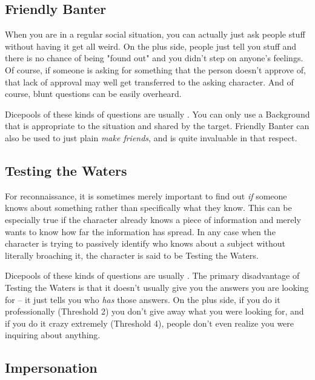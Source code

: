 \subsection{Friendly Banter}

When you are in a regular social situation, you can actually just ask people stuff without having it get all weird. On the plus side, people just tell you stuff and there is no chance of being "found out" and you didn't step on anyone's feelings. Of course, if someone is asking for something that the person doesn't approve of, that lack of approval may well get transferred to the asking character. And of course, blunt questions can be easily overheard.

Dicepools of these kinds of questions are usually . You can only use a Background that is appropriate to the situation and shared by the target. Friendly Banter can also be used to just plain \textit{make friends}, and is quite invaluable in that respect.

\subsection{Testing the Waters}

For reconnaissance, it is sometimes merely important to find out \textit{if} someone knows about something rather than specifically what they know. This can be especially true if the character already knows a piece of information and merely wants to know how far the information has spread. In any case when the character is trying to passively identify who knows about a subject without literally broaching it, the character is said to be Testing the Waters.

Dicepools of these kinds of questions are usually . The primary disadvantage of Testing the Waters is that it doesn't usually give you the answers you are looking for -- it just tells you who \textit{has} those answers. On the plus side, if you do it professionally (Threshold 2) you don't give away what you were looking for, and if you do it crazy extremely (Threshold 4), people don't even realize you were inquiring about anything.

\subsection{Impersonation}

